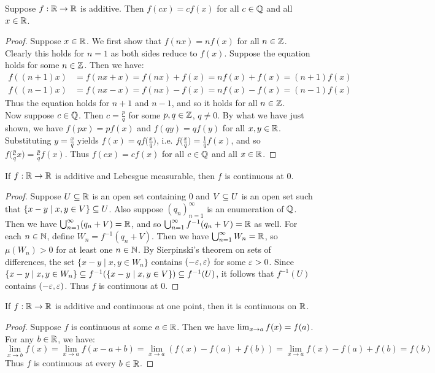 \documentclass{article}
\begin{document}
\begin{lemma}\label{additiverational}
    Suppose $f:\R\to\R$ is additive. Then $f(cx)=cf(x)$ for all $c\in\Q$ and all $x\in\R$.
\end{lemma}
\begin{proof}
    Suppose $x\in\R$. We first show that $f(nx)=nf(x)$ for all $n\in\Z$. Clearly this holds for $n=1$ as both sides reduce to $f(x)$. Suppose the equation holds for some $n\in\Z$. Then we have:
    \begin{align*}
        f((n+1)x)&=f(nx+x)=f(nx)+f(x)=nf(x)+f(x)=(n+1)f(x) \\
        f((n-1)x)&=f(nx-x)=f(nx)-f(x)=nf(x)-f(x)=(n-1)f(x)
    \end{align*}
    Thus the equation holds for $n+1$ and $n-1$, and so it holds for all $n\in\Z$.\\
    
    Now suppose $c\in\Q$. Then $c=\frac{p}{q}$ for some $p,q\in\Z$, $q\ne0$. By what we have just shown, we have $f(px)=pf(x)$ and $f(qy)=qf(y)$ for all $x,y\in\R$. Substituting $y=\frac{x}{q}$ yields $f(x)=qf\big(\frac{x}{q}\big)$, i.e. $f\big(\frac{x}{q}\big)=\frac{1}{q}f(x)$, and so $f\big(\frac{p}{q}x\big)=\frac{p}{q}f(x)$. Thus $f(cx)=cf(x)$ for all $c\in\Q$ and all $x\in\R$.
\end{proof}

\begin{proposition}\label{additivelmcont0}
    If $f:\R\to\R$ is additive and Lebesgue measurable, then $f$ is continuous at $0$.
\end{proposition}
\begin{proof}
    Suppose $U\sub\R$ is an open set containing $0$ and $V\subseteq U$ is an open set such that $\{x-y\mid x,y\in V\}\subseteq U$. Also suppose $(q_n)_{n=1}^\infty$ is an enumeration of $\Q$. Then we have $\cuppn(q_n+V)=\R$, and so $\cuppn f^{-1}(q_n+V)=\R$ as well. For each $n\in\N$, define $W_n=f^{-1}(q_n+V)$. Then we have $\cuppn W_n=\R$, so $\mu(W_n)>0$ for at least one $n\in\N$. By Sierpinski's theorem on sets of differences, the set $\{x-y\mid x,y\in W_n\}$ contains $(-\varepsilon,\varepsilon)$ for some $\varepsilon>0$. Since $\{x-y\mid x,y\in W_n\}\subseteq f^{-1}(\{x-y\mid x,y\in V\})\subseteq f^{-1}(U)$, it follows that $f^{-1}(U)$ contains $(-\varepsilon,\varepsilon)$. Thus $f$ is continuous at $0$.
\end{proof}

\begin{lemma}\label{additivec1p}
    If $f:\R\to\R$ is additive and continuous at one point, then it is continuous on $\R$.
\end{lemma}
\begin{proof}
    Suppose $f$ is continuous at some $a\in\R$. Then we have $\lim_{x\to a} f(x)=f(a)$. For any $b\in\R$, we have:
    \begin{equation*}
        \lim_{x\to b} f(x)=\lim_{x\to a} f(x-a+b)=\lim_{x\to a} (f(x)-f(a)+f(b))=\lim_{x\to a} f(x)-f(a)+f(b)=f(b)
    \end{equation*}
    Thus $f$ is continuous at every $b\in\R$.
\end{proof}
\end{document}
